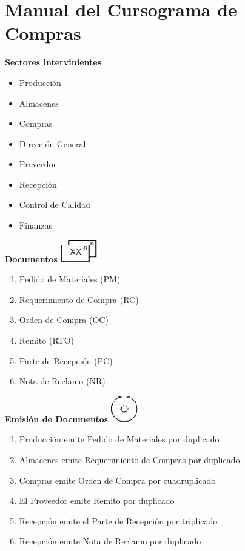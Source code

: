 \pagebreak
\section{Manual del Cursograma de Compras}
\begin{center}\textbf{Sectores intervinientes}\end{center}
\begin{itemize}
  \item Producci\'on
  \item Almacenes
  \item Compras
  \item Direcci\'on General
  \item Proveedor
  \item Recepci\'on
  \item Control de Calidad
  \item Finanzas
\end{itemize}

\begin{center}
  \textbf{Documentos}
  \includegraphics{./Images/Simbolos/simbolo-Documentos.png}
\end{center}
\begin{enumerate}
  \item Pedido de Materiales (PM)
  \item Requerimiento de Compra (RC)
  \item Orden de Compra (OC)
  \item Remito (RTO)
  \item Parte de Recepción (PC)
  \item Nota de Reclamo (NR)
\end{enumerate}

\begin{center}
  \textbf{Emisión de Documentos}
  \includegraphics{./Images/Simbolos/simbolo-Emision-de-Documentos.png}
\end{center}
\begin{enumerate}
  \item Producción emite Pedido de Materiales por duplicado
  \item Almacenes emite Requerimiento de Compras por duplicado
  \item Compras emite Orden de Compra por cuadruplicado
  \item El Proveedor emite Remito por duplicado
  \item Recepción emite el Parte de Recepción por triplicado
  \item Recepción emite Nota de Reclamo por duplicado
\end{enumerate}

